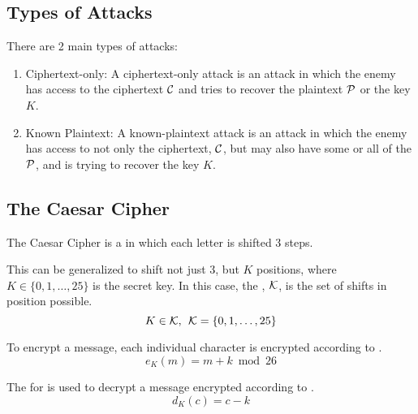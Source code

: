 \subsection{Types of Attacks}\label{subsec:Attack_Types}
There are 2 main types of attacks:
\begin{enumerate}[noitemsep]
\item Ciphertext-only: A ciphertext-only attack is an attack in which the enemy has access to the ciphertext $\operatorname{\mathcal{C}}$ and tries to recover the plaintext $\operatorname{\mathcal{P}}$ or the key $K$.
\item Known Plaintext: A known-plaintext attack is an attack in which the enemy has access to not only the ciphertext, $\operatorname{\mathcal{C}}$, but may also have some or all of the $\operatorname{\mathcal{P}}$, and is trying to recover the key $K$.
\end{enumerate}

\subsection{The Caesar Cipher}\label{subsec:The_Caesar_Cipher}
The Caesar Cipher is a  in which each letter is shifted 3 steps.

This can be generalized to shift not just 3, but $K$ positions, where $K \in \lbrace 0, 1, \ldots, 25 \rbrace$ is the secret key.
In this case, the , $\operatorname{\mathcal{K}}$, is the set of shifts in position possible.
\begin{equation*}
  K \in \operatorname{\mathcal{K}}, \:\: \operatorname{\mathcal{K}} = \lbrace 0, 1, \ldots, 25 \rbrace
\end{equation*}

To encrypt a message, each individual character is encrypted according to .
\begin{equation}\label{eq:The_Caesar_Cipher-Encryption}
  e_{K}(m) = m + k \bmod 26
\end{equation}

The  for  is used to decrypt a message encrypted according to .
\begin{equation}\label{eq:The_Caesar_Cipher-Decryption}
  d_{K}(c) = c - k
\end{equation}

